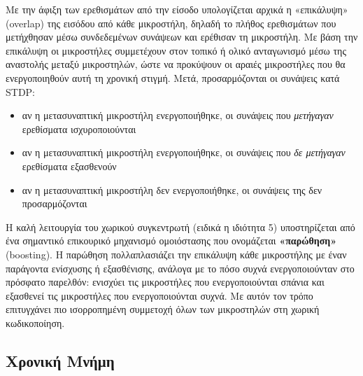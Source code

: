	Με την άφιξη των ερεθισμάτων από την είσοδο υπολογίζεται αρχικά η «επικάλυψη» (overlap) της εισόδου από κάθε μικροστήλη,
	δηλαδή το πλήθος ερεθισμάτων που μετήχθησαν μέσω συνδεδεμένων συνάψεων και ερέθισαν τη μικροστήλη.
	Με βάση την επικάλυψη οι μικροστήλες συμμετέχουν στον τοπικό ή ολικό ανταγωνισμό μέσω της αναστολής μεταξύ μικροστηλών,
	ώστε να προκύψουν οι αραιές μικροστήλες που θα ενεργοποιηθούν αυτή τη χρονική στιγμή.
	Μετά, προσαρμόζονται οι συνάψεις κατά STDP:
	\begin{itemize}
		\item αν η μετασυναπτική μικροστήλη ενεργοποιήθηκε, οι συνάψεις που \textit{μετήγαγαν} ερεθίσματα ισχυροποιούνται
		\item αν η μετασυναπτική μικροστήλη ενεργοποιήθηκε, οι συνάψεις που \textit{δε μετήγαγαν} ερεθίσματα εξασθενούν
		\item αν η μετασυναπτική μικροστήλη δεν ενεργοποιήθηκε, οι συνάψεις της δεν προσαρμόζονται
	\end{itemize}

	Η καλή λειτουργία του χωρικού συγκεντρωτή (ειδικά η ιδιότητα 5) υποστηρίζεται από ένα σημαντικό επικουρικό μηχανισμό ομοιόστασης που ονομάζεται \textbf{«παρώθηση»} (boosting).
	Η παρώθηση πολλαπλασιάζει την επικάλυψη κάθε μικροστήλης με έναν παράγοντα ενίσχυσης ή εξασθένισης, ανάλογα με το πόσο συχνά ενεργοποιούνταν στο πρόσφατο παρελθόν:
	ενισχύει τις μικροστήλες που ενεργοποιούνται σπάνια και εξασθενεί τις μικροστήλες που ενεργοποιούνται συχνά.
	Με αυτόν τον τρόπο επιτυγχάνει πιο ισορροπημένη συμμετοχή όλων των μικροστηλών στη χωρική κωδικοποίηση.

\subsection{Χρονική Μνήμη} \label{htm:tm}


